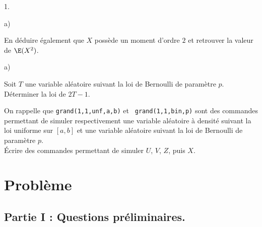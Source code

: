 \begin{noliste}{1.}
\begin{noliste}{a)}
  \item En déduire également que $X$ possède un moment d'ordre $2$ et
    retrouver la valeur de $\E(X^{2})$.

    

\end{noliste}

\item
  \begin{noliste}{a)}
    \setlength{\itemsep}{2mm}
  \item Soit $T$ une variable aléatoire suivant la loi de Bernoulli de
    paramètre $p$.\\
    Déterminer la loi de $2T-1$.

    

  \item On rappelle que {\tt grand(1,1,\ttq{}unf\ttq{},a,b)} et {\tt
      grand(1,1,\ttq{}bin\ttq{},p)} sont des commandes \Scilab{}
    permettant de simuler respectivement une variable aléatoire à
    densité suivant la loi uniforme sur $[a,b]$ et une variable
    aléatoire suivant la loi de Bernoulli de paramètre $p$.\\
    Écrire des commandes \Scilab{} permettant de simuler $U$, $V$,
    $Z$, puis $X$.

    
  \end{noliste}
\end{noliste}

\section*{Problème}

\subsection*{Partie I : Questions préliminaires.}

